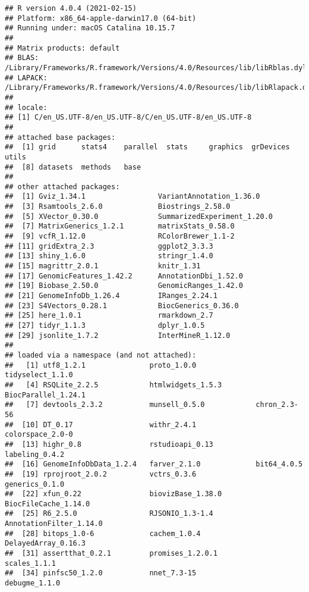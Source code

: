 \documentclass[
]{article}
\begin{document}
\begin{verbatim}
## R version 4.0.4 (2021-02-15)
## Platform: x86_64-apple-darwin17.0 (64-bit)
## Running under: macOS Catalina 10.15.7
## 
## Matrix products: default
## BLAS:   /Library/Frameworks/R.framework/Versions/4.0/Resources/lib/libRblas.dylib
## LAPACK: /Library/Frameworks/R.framework/Versions/4.0/Resources/lib/libRlapack.dylib
## 
## locale:
## [1] C/en_US.UTF-8/en_US.UTF-8/C/en_US.UTF-8/en_US.UTF-8
## 
## attached base packages:
##  [1] grid      stats4    parallel  stats     graphics  grDevices utils    
##  [8] datasets  methods   base     
## 
## other attached packages:
##  [1] Gviz_1.34.1                 VariantAnnotation_1.36.0   
##  [3] Rsamtools_2.6.0             Biostrings_2.58.0          
##  [5] XVector_0.30.0              SummarizedExperiment_1.20.0
##  [7] MatrixGenerics_1.2.1        matrixStats_0.58.0         
##  [9] vcfR_1.12.0                 RColorBrewer_1.1-2         
## [11] gridExtra_2.3               ggplot2_3.3.3              
## [13] shiny_1.6.0                 stringr_1.4.0              
## [15] magrittr_2.0.1              knitr_1.31                 
## [17] GenomicFeatures_1.42.2      AnnotationDbi_1.52.0       
## [19] Biobase_2.50.0              GenomicRanges_1.42.0       
## [21] GenomeInfoDb_1.26.4         IRanges_2.24.1             
## [23] S4Vectors_0.28.1            BiocGenerics_0.36.0        
## [25] here_1.0.1                  rmarkdown_2.7              
## [27] tidyr_1.1.3                 dplyr_1.0.5                
## [29] jsonlite_1.7.2              InterMineR_1.12.0          
## 
## loaded via a namespace (and not attached):
##   [1] utf8_1.2.1               proto_1.0.0              tidyselect_1.1.0        
##   [4] RSQLite_2.2.5            htmlwidgets_1.5.3        BiocParallel_1.24.1     
##   [7] devtools_2.3.2           munsell_0.5.0            chron_2.3-56            
##  [10] DT_0.17                  withr_2.4.1              colorspace_2.0-0        
##  [13] highr_0.8                rstudioapi_0.13          labeling_0.4.2          
##  [16] GenomeInfoDbData_1.2.4   farver_2.1.0             bit64_4.0.5             
##  [19] rprojroot_2.0.2          vctrs_0.3.6              generics_0.1.0          
##  [22] xfun_0.22                biovizBase_1.38.0        BiocFileCache_1.14.0    
##  [25] R6_2.5.0                 RJSONIO_1.3-1.4          AnnotationFilter_1.14.0 
##  [28] bitops_1.0-6             cachem_1.0.4             DelayedArray_0.16.3     
##  [31] assertthat_0.2.1         promises_1.2.0.1         scales_1.1.1            
##  [34] pinfsc50_1.2.0           nnet_7.3-15              debugme_1.1.0           

\end{verbatim}
\end{document}
